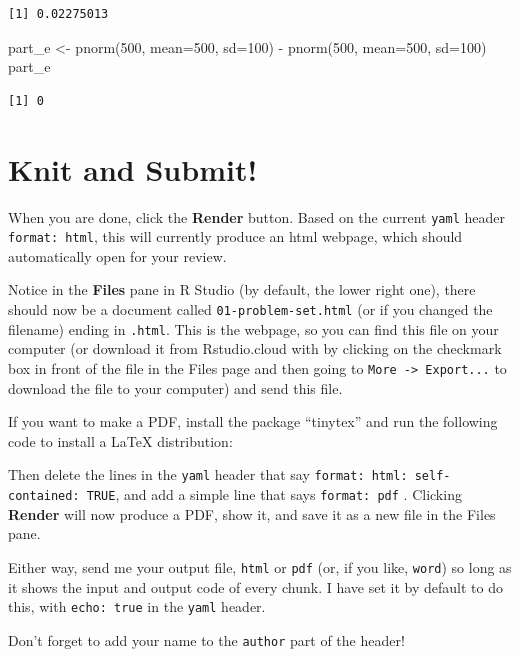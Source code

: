 \documentclass[
  letterpaper,
  DIV=11,
  numbers=noendperiod]{scrartcl}
\newenvironment{Shaded}{\begin{snugshade}}{\end{snugshade}}
\newcommand{\AttributeTok}[1]{\textcolor[rgb]{0.40,0.45,0.13}{#1}}
\newcommand{\DecValTok}[1]{\textcolor[rgb]{0.68,0.00,0.00}{#1}}
\newcommand{\FunctionTok}[1]{\textcolor[rgb]{0.28,0.35,0.67}{#1}}
\newcommand{\NormalTok}[1]{\textcolor[rgb]{0.00,0.23,0.31}{#1}}
\newcommand{\OtherTok}[1]{\textcolor[rgb]{0.00,0.23,0.31}{#1}}
\newcommand{\SpecialCharTok}[1]{\textcolor[rgb]{0.37,0.37,0.37}{#1}}
\begin{document}
\begin{verbatim}
[1] 0.02275013
\end{verbatim}

\begin{Shaded}
\begin{Highlighting}[]
\NormalTok{part\_e }\OtherTok{\textless{}{-}} \FunctionTok{pnorm}\NormalTok{(}\DecValTok{500}\NormalTok{, }\AttributeTok{mean=}\DecValTok{500}\NormalTok{, }\AttributeTok{sd=}\DecValTok{100}\NormalTok{) }\SpecialCharTok{{-}} \FunctionTok{pnorm}\NormalTok{(}\DecValTok{500}\NormalTok{, }\AttributeTok{mean=}\DecValTok{500}\NormalTok{, }\AttributeTok{sd=}\DecValTok{100}\NormalTok{)}
\NormalTok{part\_e}
\end{Highlighting}
\end{Shaded}

\begin{verbatim}
[1] 0
\end{verbatim}

\hypertarget{knit-and-submit}{%
\section{Knit and Submit!}\label{knit-and-submit}}

When you are done, click the \textbf{Render} button. Based on the
current \texttt{yaml} header \texttt{format:\ html}, this will currently
produce an html webpage, which should automatically open for your
review.

Notice in the \textbf{Files} pane in R Studio (by default, the lower
right one), there should now be a document called
\texttt{01-problem-set.html} (or if you changed the filename) ending in
\texttt{.html}. This is the webpage, so you can find this file on your
computer (or download it from Rstudio.cloud with by clicking on the
checkmark box in front of the file in the Files page and then going to
\texttt{More\ -\textgreater{}\ Export...} to download the file to your
computer) and send this file.

If you want to make a PDF, install the package ``tinytex'' and run the
following code to install a LaTeX distribution:

Then delete the lines in the \texttt{yaml} header that say
\texttt{format:\ html:\ self-contained:\ TRUE}, and add a simple line
that says \texttt{format:\ pdf} . Clicking \textbf{Render} will now
produce a PDF, show it, and save it as a new file in the Files pane.

Either way, send me your output file, \texttt{html} or \texttt{pdf} (or,
if you like, \texttt{word}) so long as it shows the input and output
code of every chunk. I have set it by default to do this, with
\texttt{echo:\ true} in the \texttt{yaml} header.

Don't forget to add your name to the \texttt{author} part of the header!
\end{document}
